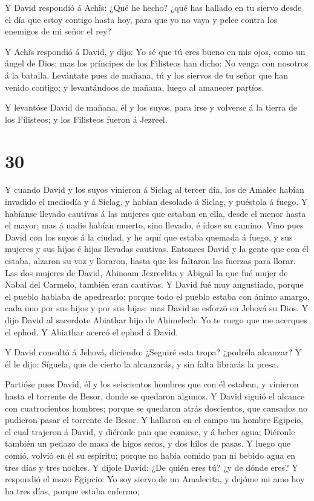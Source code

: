  Y David respondió á Achîs: ¿Qué he hecho? ¿qué has hallado
en tu siervo desde el día que estoy contigo hasta hoy, para que yo no
vaya y pelee contra los enemigos de mi señor el rey?

 Y Achîs respondió á David, y dijo: Yo sé que tú eres bueno
en mis ojos, como un ángel de Dios; mas los príncipes de los Filisteos
han dicho: No venga con nosotros á la batalla.  Levántate
pues de mañana, tú y los siervos de tu señor que han venido contigo; y
levantándoos de mañana, luego al amanecer partíos.

 Y levantóse David de mañana, él y los suyos, para irse y
volverse á la tierra de los Filisteos; y los Filisteos fueron á Jezreel.

\hypertarget{section-29}{%
\section{30}\label{section-29}}

 Y cuando David y los suyos vinieron á Siclag al tercer día,
los de Amalec habían invadido el mediodía y á Siclag, y habían desolado
á Siclag, y puéstola á fuego.  Y habíanse llevado cautivas á
las mujeres que estaban en ella, desde el menor hasta el mayor; mas á
nadie habían muerto, sino llevado, é ídose su camino.  Vino
pues David con los suyos á la ciudad, y he aquí que estaba quemada á
fuego, y sus mujeres y sus hijos é hijas llevadas cautivas. 
Entonces David y la gente que con él estaba, alzaron su voz y lloraron,
hasta que les faltaron las fuerzas para llorar.  Las dos
mujeres de David, Ahinoam Jezreelita y Abigail la que fué mujer de Nabal
del Carmelo, también eran cautivas.  Y David fué muy
angustiado, porque el pueblo hablaba de apedrearlo; porque todo el
pueblo estaba con ánimo amargo, cada uno por sus hijos y por sus hijas:
mas David se esforzó en Jehová su Dios.  Y dijo David al
sacerdote Abiathar hijo de Ahimelech: Yo te ruego que me acerques el
ephod. Y Abiathar acercó el ephod á David.

 Y David consultó á Jehová, diciendo: ¿Seguiré esta tropa?
¿podréla alcanzar? Y él le dijo: Síguela, que de cierto la alcanzarás, y
sin falta librarás la presa.

 Partióse pues David, él y los seiscientos hombres que con
él estaban, y vinieron hasta el torrente de Besor, donde se quedaron
algunos.  Y David siguió el alcance con cuatrocientos
hombres; porque se quedaron atrás doscientos, que cansados no pudieron
pasar el torrente de Besor.  Y hallaron en el campo un
hombre Egipcio, el cual trajeron á David, y diéronle pan que comiese, y
á beber agua;  Diéronle también un pedazo de masa de higos
secos, y dos hilos de pasas. Y luego que comió, volvió en él su
espíritu; porque no había comido pan ni bebido agua en tres días y tres
noches.  Y díjole David: ¿De quién eres tú? ¿y de dónde
eres? Y respondió el mozo Egipcio: Yo soy siervo de un Amalecita, y
dejóme mi amo hoy ha tres días, porque estaba enfermo;

